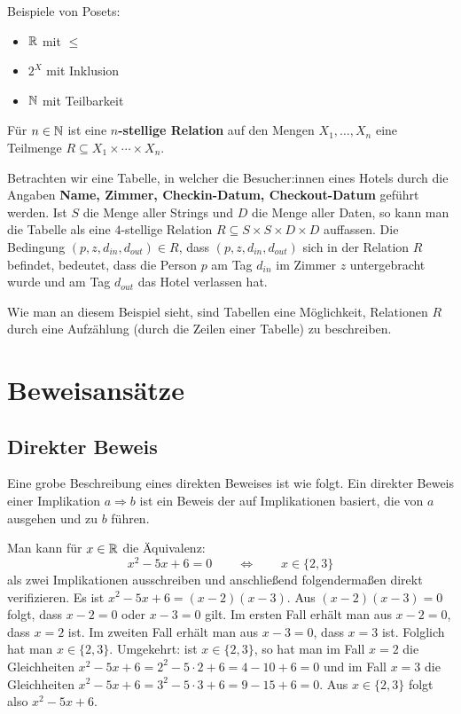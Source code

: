 \begin{bsp} Beispiele von Posets:
	\begin{itemize}
		\item $\mathbb{R}$ mit $\leq$
		\item $2^X$ mit Inklusion 
		\item $\mathbb{N}$ mit Teilbarkeit
	\end{itemize} 
\end{bsp} 

\begin{defn}
	Für $n \in \mathbb{N}$ ist eine \textbf{$n$-stellige Relation} auf den Mengen $X_1,\ldots,X_n$ eine Teilmenge $R \subseteq X_1 \times \cdots \times X_n$. 
\end{defn} 

\begin{bsp}
	Betrachten wir eine Tabelle, in welcher die Besucher:innen eines Hotels durch die Angaben \textbf{Name, Zimmer, Checkin-Datum, Checkout-Datum} geführt werden. Ist $S$ die Menge aller Strings und $D$ die Menge aller Daten, so kann man die Tabelle als eine $4$-stellige Relation  $R \subseteq S \times S \times D \times D$ auffassen. Die Bedingung $(p,z,d_{in},d_{out}) \in R$, dass $(p,z,d_{in},d_{out})$ sich in der Relation $R$ befindet,  bedeutet, dass die Person $p$ am Tag $d_{in}$ im Zimmer $z$ untergebracht wurde und am Tag $d_{out}$ das Hotel verlassen hat. 
	
	Wie man an diesem Beispiel sieht, sind Tabellen eine Möglichkeit, Relationen $R$ durch eine Aufzählung (durch die Zeilen einer Tabelle) zu beschreiben. 
\end{bsp} 


\section{Beweisansätze} 

\subsection{Direkter Beweis} 

\begin{bem}
	Eine grobe Beschreibung eines direkten Beweises ist wie folgt. Ein direkter Beweis einer Implikation $a \Rightarrow b$ ist ein Beweis der auf Implikationen basiert, die von $a$ ausgehen und zu $b$ führen.
\end{bem} 

\begin{bem}
	Man kann für $x \in \mathbb{R}$ die Äquivalenz: 
	\[
			x^2 - 5 x + 6 = 0  \qquad \Longleftrightarrow \qquad x \in \{2,3\}
	\]
	als zwei Implikationen ausschreiben und anschließend 
	folgendermaßen direkt verifizieren. Es ist $x^2 - 5 x + 6 = (x-2) (x-3)$. Aus $(x-2) (x-3)=0$ folgt, dass $x-2=0$ oder $x-3=0$ gilt. Im ersten Fall erhält man aus $x-2=0$, dass $x=2$ ist. Im zweiten Fall erhält man aus $x-3 = 0$, dass $x=3$ ist. Folglich hat man $x \in \{2,3\}$. Umgekehrt: ist $x \in \{2,3\}$, so hat man im Fall $x=2$ die Gleichheiten $x^2 - 5 x + 6= 2^2 - 5 \cdot 2 + 6 = 4- 10 + 6 =0$ und im Fall $x=3$ die Gleichheiten $x^2 - 5 x + 6 = 3^2 - 5 \cdot 3 + 6 = 9 - 15 + 6 = 0$. Aus $x \in \{2,3\}$ folgt also $x^2 - 5 x + 6$. 
\end{bem} 


